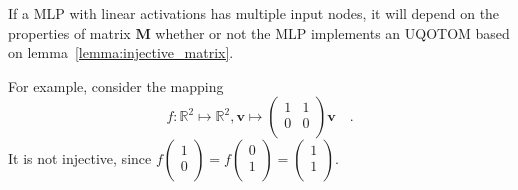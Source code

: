 \documentclass[../../main.tex]{subfiles}
\begin{document}
    \begin{remark}
        If a MLP with linear activations has multiple input nodes, it will depend on the properties of matrix $\bm{M}$ whether or not the MLP implements an UQOTOM based on lemma~\ref{lemma:injective_matrix}.

        For example, consider the mapping
        \[
            f: \mathbb{R}^2 \mapsto \mathbb{R}^2, \bm{v} \mapsto
            \begin{pmatrix*}
                1 & 1 \\
                0 & 0 \\
            \end{pmatrix*}
            \bm{v} \quad .
        \]
        It is not injective, since $f
        \begin{pmatrix*}
            1 \\
            0 \\
        \end{pmatrix*} = f
        \begin{pmatrix*}
            0 \\
            1 \\
        \end{pmatrix*}
        =
        \begin{pmatrix*}
            1 \\
            1 \\
        \end{pmatrix*}$.
    \end{remark}
\end{document}
